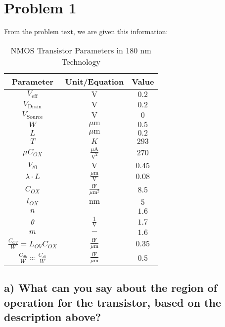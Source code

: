 \section{Problem 1}
From the problem text, we are given this information:

\begin{table}[h]
    \centering
    \caption{NMOS Transistor Parameters in 180 nm Technology}
    \begin{tabular}{ccc}
        \hline
        Parameter & Unit/Equation & Value \\
        \hline
        \( V_{\text{eff}} \) & \( \text{V} \) & \( 0.2 \) \\
        \( V_{\text{Drain}} \) & \( \text{V} \) & \( 0.2 \) \\
        \( V_{\text{Source}} \) & \( \text{V} \) & \( 0 \) \\
        \( W \) & \( \mu\text{m} \) & \( 0.5 \) \\
        \( L \) & \( \mu\text{m} \) & \( 0.2 \) \\
        \( T \) & \( K \) & \( 293 \) \\
        \( \mu C_{OX} \) & \( \frac{\mu \text{A}}{\text{V}^2} \) & \( 270 \) \\
        \( V_{t0} \) & \( \text{V} \) & \( 0.45 \) \\
        \( \lambda \cdot L \) & \( \frac{\mu\text{m}}{\text{V}} \) & \( 0.08 \) \\
        \( C_{OX} \) & \( \frac{\text{fF}}{\mu\text{m}^2} \) & \( 8.5 \) \\
        \( t_{OX} \) & \( \text{nm} \) & \( 5 \) \\
        \( n \) & \( - \) & \( 1.6 \) \\
        \( \theta \) & \( \frac{1}{\text{V}} \) & \( 1.7 \) \\
        \( m \) & \( - \) & \( 1.6 \) \\
        \( \frac{C_{OV}}{W} = L_{OV} C_{OX} \) & \( \frac{\text{fF}}{\mu\text{m}} \) & \( 0.35 \) \\
        \( \frac{C_{db}}{W} \approx \frac{C_{sb}}{W} \) & \( \frac{\text{fF}}{\mu\text{m}} \) & \( 0.5 \) \\
        \hline
    \end{tabular}
\end{table}



\subsection*{a) What can you say about the region of operation for the transistor, based on the description above?}

